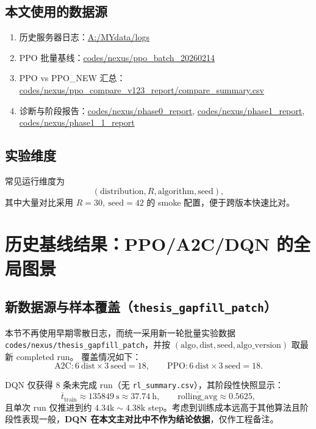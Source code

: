 ﻿\documentclass[11pt,a4paper]{ctexart}
\begin{document}
\subsection{本文使用的数据源}
\begin{enumerate}[leftmargin=*]
  \item 历史服务器日志：\url{A:/MYdata/logs}
  \item PPO 批量基线：\url{codes/nexus/ppo_batch_20260214}
  \item PPO vs PPO\_NEW 汇总：\url{codes/nexus/ppo_compare_v123_report/compare_summary.csv}
  \item 诊断与阶段报告：\url{codes/nexus/phase0_report}, \url{codes/nexus/phase1_report}, \url{codes/nexus/phase1_1_report}
\end{enumerate}

\subsection{实验维度}
常见运行维度为
\begin{equation}
(\text{distribution},R,\text{algorithm},\text{seed}),
\end{equation}
其中大量对比采用 $R=30,\ \text{seed}=42$ 的 smoke 配置，便于跨版本快速比对。

\section{历史基线结果：PPO/A2C/DQN 的全局图景}
\subsection{新数据源与样本覆盖（\texttt{thesis\_gapfill\_patch}）}
本节不再使用早期零散日志，而统一采用新一轮批量实验数据
\texttt{codes/nexus/thesis\_gapfill\_patch}，并按
\((\text{algo},\text{dist},\text{seed},\text{algo\_version})\) 取最新 completed run。
覆盖情况如下：
\begin{equation}
\text{A2C}:6\ \text{dist}\times 3\ \text{seed}=18,\qquad
\text{PPO}:6\ \text{dist}\times 3\ \text{seed}=18.
\end{equation}

DQN 仅获得 8 条未完成 run（无 \texttt{rl\_summary.csv}），其阶段性快照显示：
\begin{equation}
\overline{t}_{\text{train}}\approx 135849\ \text{s}\approx 37.74\ \text{h},
\qquad
\overline{\text{rolling\_avg}}\approx 0.5625,
\end{equation}
且单次 run 仅推进到约 \(4.34\text{k}\sim 4.38\text{k}\) step。考虑到训练成本远高于其他算法且阶段性表现一般，\textbf{DQN 在本文主对比中不作为结论依据}，仅作工程备注。
\end{document}
